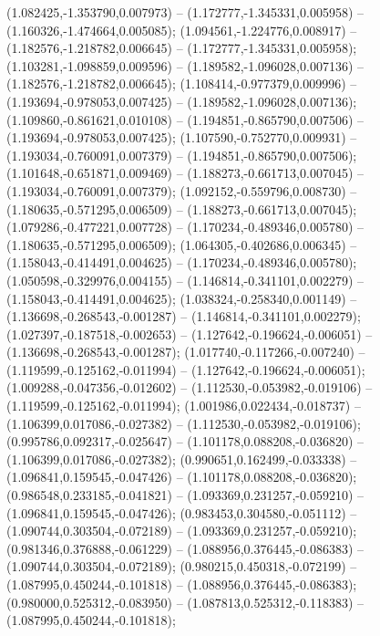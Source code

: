  (1.082425,-1.353790,0.007973) -- (1.172777,-1.345331,0.005958) -- (1.160326,-1.474664,0.005085);
 (1.094561,-1.224776,0.008917) -- (1.182576,-1.218782,0.006645) -- (1.172777,-1.345331,0.005958);
 (1.103281,-1.098859,0.009596) -- (1.189582,-1.096028,0.007136) -- (1.182576,-1.218782,0.006645);
 (1.108414,-0.977379,0.009996) -- (1.193694,-0.978053,0.007425) -- (1.189582,-1.096028,0.007136);
 (1.109860,-0.861621,0.010108) -- (1.194851,-0.865790,0.007506) -- (1.193694,-0.978053,0.007425);
 (1.107590,-0.752770,0.009931) -- (1.193034,-0.760091,0.007379) -- (1.194851,-0.865790,0.007506);
 (1.101648,-0.651871,0.009469) -- (1.188273,-0.661713,0.007045) -- (1.193034,-0.760091,0.007379);
 (1.092152,-0.559796,0.008730) -- (1.180635,-0.571295,0.006509) -- (1.188273,-0.661713,0.007045);
 (1.079286,-0.477221,0.007728) -- (1.170234,-0.489346,0.005780) -- (1.180635,-0.571295,0.006509);
 (1.064305,-0.402686,0.006345) -- (1.158043,-0.414491,0.004625) -- (1.170234,-0.489346,0.005780);
 (1.050598,-0.329976,0.004155) -- (1.146814,-0.341101,0.002279) -- (1.158043,-0.414491,0.004625);
 (1.038324,-0.258340,0.001149) -- (1.136698,-0.268543,-0.001287) -- (1.146814,-0.341101,0.002279);
 (1.027397,-0.187518,-0.002653) -- (1.127642,-0.196624,-0.006051) -- (1.136698,-0.268543,-0.001287);
 (1.017740,-0.117266,-0.007240) -- (1.119599,-0.125162,-0.011994) -- (1.127642,-0.196624,-0.006051);
 (1.009288,-0.047356,-0.012602) -- (1.112530,-0.053982,-0.019106) -- (1.119599,-0.125162,-0.011994);
 (1.001986,0.022434,-0.018737) -- (1.106399,0.017086,-0.027382) -- (1.112530,-0.053982,-0.019106);
 (0.995786,0.092317,-0.025647) -- (1.101178,0.088208,-0.036820) -- (1.106399,0.017086,-0.027382);
 (0.990651,0.162499,-0.033338) -- (1.096841,0.159545,-0.047426) -- (1.101178,0.088208,-0.036820);
 (0.986548,0.233185,-0.041821) -- (1.093369,0.231257,-0.059210) -- (1.096841,0.159545,-0.047426);
 (0.983453,0.304580,-0.051112) -- (1.090744,0.303504,-0.072189) -- (1.093369,0.231257,-0.059210);
 (0.981346,0.376888,-0.061229) -- (1.088956,0.376445,-0.086383) -- (1.090744,0.303504,-0.072189);
 (0.980215,0.450318,-0.072199) -- (1.087995,0.450244,-0.101818) -- (1.088956,0.376445,-0.086383);
 (0.980000,0.525312,-0.083950) -- (1.087813,0.525312,-0.118383) -- (1.087995,0.450244,-0.101818);
